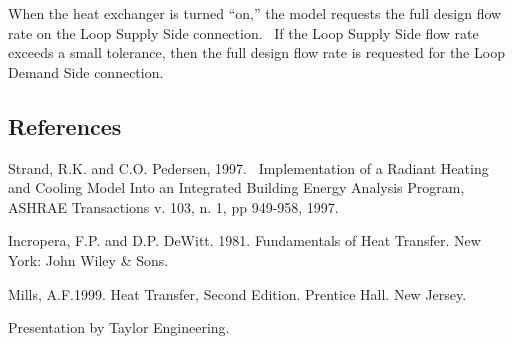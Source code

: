 When the heat exchanger is turned ``on,'' the model requests the full design flow rate on the Loop Supply Side connection.~ If the Loop Supply Side flow rate exceeds a small tolerance, then the full design flow rate is requested for the Loop Demand Side connection.

\subsection{References}\label{references-5-002}

Strand, R.K. and C.O. Pedersen, 1997.~ Implementation of a Radiant Heating and Cooling Model Into an Integrated Building Energy Analysis Program, ASHRAE Transactions v. 103, n. 1, pp 949-958, 1997.

Incropera, F.P. and D.P. DeWitt. 1981. Fundamentals of Heat Transfer. New York: John Wiley \& Sons.

Mills, A.F.1999. Heat Transfer, Second Edition. Prentice Hall. New Jersey.

Presentation by Taylor Engineering.
